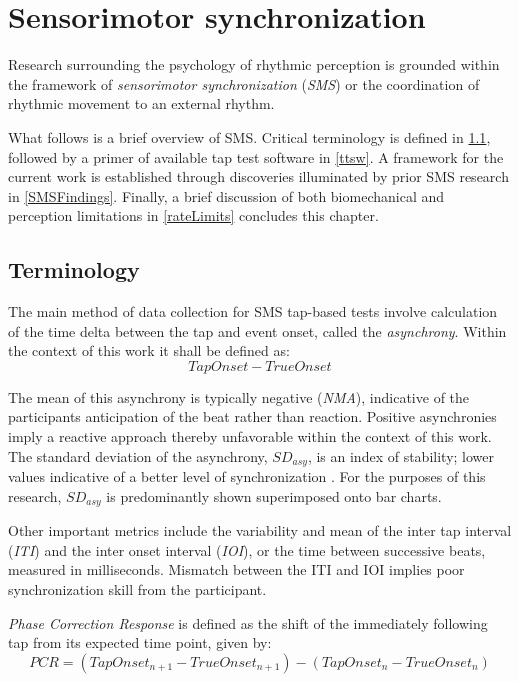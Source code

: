 \section{Sensorimotor synchronization}
Research surrounding the psychology of rhythmic perception is grounded within the framework of \textit{sensorimotor synchronization} (\textit{SMS}) or the coordination of rhythmic movement to an external rhythm. 

What follows is a brief overview of SMS. Critical terminology is defined in \ref{SMSTerms}, followed by a primer of available tap test software in \ref{ttsw}. A framework for the current work is established through discoveries illuminated by prior SMS research in \ref{SMSFindings}. Finally, a brief discussion of both biomechanical and perception limitations in \ref{rateLimits} concludes this chapter.

\subsection{Terminology} \label{SMSTerms}
The main method of data collection for SMS tap-based tests involve calculation of the time delta between the tap and event onset, called the \textit{asynchrony}. Within the context of this work it shall be defined as:
\begin{equation*}Tap Onset-True Onset\end{equation*} 

The mean of this asynchrony is typically negative (\textit{NMA}), indicative of the participants anticipation of the beat rather than reaction. Positive asynchronies imply a reactive approach thereby unfavorable within the context of this work. The standard deviation of the asynchrony, $SD_{asy}$, is an index of stability; lower values indicative of a better level of synchronization \cite{repp2013sensorimotor}. For the purposes of this research, $SD_{asy}$ is predominantly shown superimposed onto bar charts.

Other important metrics include the variability and mean of the inter tap interval (\textit{ITI}) and the inter onset interval (\textit{IOI}), or the time between successive beats, measured in milliseconds. Mismatch between the ITI and IOI implies poor synchronization skill from the participant. 

\textit{Phase Correction Response} is defined as the shift of the immediately following tap from its expected time point, given by:
\begin{equation*}
    PCR = (Tap Onset_{n+1} - True Onset_{n+1})-(Tap Onset_{n} - True Onset_{n})
\end{equation*}

